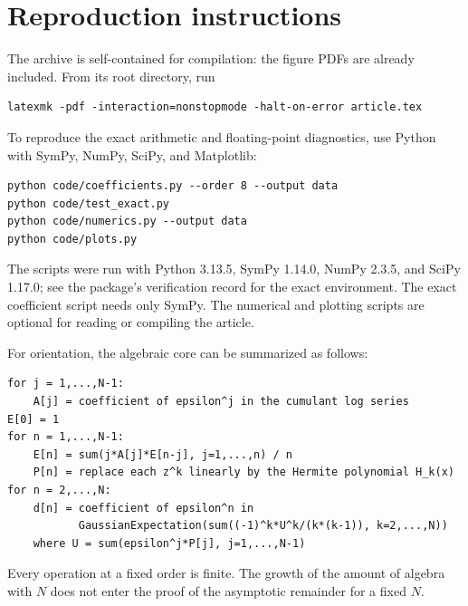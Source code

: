 \documentclass[11pt,a4paper]{article}
\numberwithin{equation}{section}
\theoremstyle{definition}
\theoremstyle{remark}
\begin{document}
\section{Reproduction instructions}
\label{app:reproduce}

The archive is self-contained for compilation: the figure PDFs are already
included. From its root directory, run
\begin{lstlisting}
latexmk -pdf -interaction=nonstopmode -halt-on-error article.tex
\end{lstlisting}
To reproduce the exact arithmetic and floating-point diagnostics, use Python
with SymPy, NumPy, SciPy, and Matplotlib:
\begin{lstlisting}
python code/coefficients.py --order 8 --output data
python code/test_exact.py
python code/numerics.py --output data
python code/plots.py
\end{lstlisting}
The scripts were run with Python 3.13.5, SymPy 1.14.0, NumPy 2.3.5, and
SciPy 1.17.0; see the package's verification record for the exact environment.
The exact coefficient script needs only SymPy. The numerical and plotting
scripts are optional for reading or compiling the article.

For orientation, the algebraic core can be summarized as follows:
\begin{lstlisting}
for j = 1,...,N-1:
    A[j] = coefficient of epsilon^j in the cumulant log series
E[0] = 1
for n = 1,...,N-1:
    E[n] = sum(j*A[j]*E[n-j], j=1,...,n) / n
    P[n] = replace each z^k linearly by the Hermite polynomial H_k(x)
for n = 2,...,N:
    d[n] = coefficient of epsilon^n in
           GaussianExpectation(sum((-1)^k*U^k/(k*(k-1)), k=2,...,N))
    where U = sum(epsilon^j*P[j], j=1,...,N-1)
\end{lstlisting}
Every operation at a fixed order is finite. The growth of the amount of algebra
with $N$ does not enter the proof of the asymptotic remainder for a fixed $N$.
\end{document}
